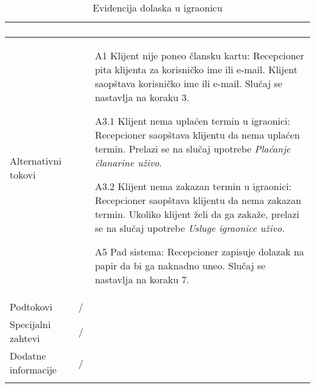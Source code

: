 \documentclass[../main.tex]{subfiles}
\begin{document}
\begin{longtable}{| p{} | p{} |}
\begin{enumerate}
    \end{enumerate}\\
\hline
    Alternativni tokovi & \begin{itemize}
        \item[A1] Klijent nije poneo člansku kartu: Recepcioner pita klijenta za korisničko ime ili e-mail. Klijent saopštava korisničko ime ili e-mail. Slučaj se nastavlja na koraku 3.
        \item[A3.1] Klijent nema uplaćen termin u igraonici: Recepcioner saopštava klijentu da nema uplaćen termin. Prelazi se na slučaj upotrebe \textit{Plaćanje članarine uživo}.
        \item[A3.2] Klijent nema zakazan termin u igraonici: Recepcioner saopštava klijentu da nema zakazan termin. Ukoliko klijent želi da ga zakaže, prelazi se na slučaj upotrebe \textit{Usluge igraonice uživo.} 
        \item[A5] Pad sistema: Recepcioner zapisuje dolazak na papir da bi ga naknadno uneo. Slučaj se nastavlja na koraku 7.
    \end{itemize}\\
\hline
    Podtokovi & /\\
\hline
    Specijalni zahtevi & /\\
\hline
    Dodatne informacije & /\\
\hline
\caption{Evidencija dolaska u igraonicu}
\end{longtable}
\end{document}
